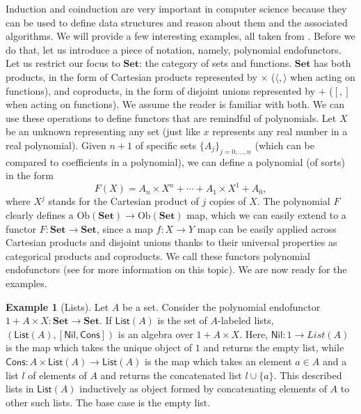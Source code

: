 \documentclass[12pt,a4paper,openright,twoside]{report}
\theoremstyle{plain}
\theoremstyle{definition}
\newtheorem{example}[proposition]{Example}
\begin{document}
Induction and coinduction are very important in computer science because they can be used to define data structures and reason about them and the associated algorithms. We will provide a few interesting examples, all taken from \cite{gavranovicposition}. Before we do that, let us introduce a piece of notation, namely, polynomial endofunctors. Let us restrict our focus to $\mathbf{Set}$: the category of sets and functions. $\mathbf{Set}$ has both products, in the form of Cartesian products represented by $\times$ ($\langle,\rangle$ when acting on functions), and coproducts, in the form of disjoint unions represented by $+$ ($[,]$ when acting on functions). We assume the reader is familiar with both. We can use these operations to define functors that are remindful of polynomials. Let $X$ be an unknown representing any set (just like $x$ represents any real number in a real polynomial). Given $n+1$ of specific sets $\{A_j\}_{j = 0,\dots,n}$ (which can be compared to coefficients in a polynomial), we can define a polynomial (of sorts) in the form
\[F(X) = A_n \times X^n + \cdots + A_1 \times X^1 + A_0,\]
where $X^j$ stands for the Cartesian product of $j$ copies of $X$. 
The polynomial $F$ clearly defines a $\mathrm{Ob}(\mathbf{Set}) \to \mathrm{Ob}(\mathbf{Set})$ map, which we can easily extend to a functor $F: \mathbf{Set} \to \mathbf{Set}$, since a map $f:X \to Y$ map can be easily applied across Cartesian products and disjoint unions thanks to their universal properties as categorical products and coproducts. We call these functors polynomial endofunctors (see \cite{jacobs1997tutorial} for more information on this topic). We are now ready for the examples.


\begin{example}[Lists]
  \label{ex: lists}
  Let $A$ be a set. Consider the polynomial endofunctor $1 + A \times X: \mathbf{Set} \to \mathbf{Set}$. If $\mathsf{List}(A)$ is the set of $A$-labeled lists, $(\mathsf{List}(A), [\mathsf{Nil}, \mathsf{Cons}])$ is an algebra over $1 + A \times X$. Here, $\mathsf{Nil}: 1 \to {List}(A)$ is the map which takes the unique object of $1$ and returns the empty list, while $\mathsf{Cons}: A \times \mathsf{List}(A) \to \mathsf{List}(A)$ is the map which takes an element $a \in A$ and a list $l$ of elements of $A$ and returns the concatenated list $l \cup \{a\}$. This described lists in $\mathsf{List}(A)$ inductively as object formed by concatenating elements of $A$ to other such lists. The base case is the empty list.
\end{example}
\end{document}
